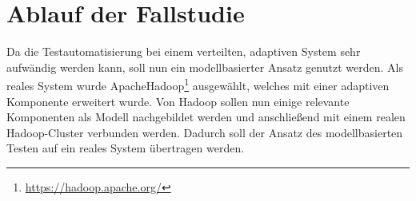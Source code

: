 \chapter{Ablauf der Fallstudie}\label{sec:fallstudie}

Da die Testautomatisierung bei einem verteilten, adaptiven System sehr aufwändig werden kann, soll nun ein modellbasierter Ansatz genutzt werden. Als reales System wurde Apache\texttrademark Hadoop\textregistered\footnote{\url{https://hadoop.apache.org/}} ausgewählt, welches mit einer adaptiven Komponente erweitert wurde. Von Hadoop sollen nun einige relevante Komponenten als Modell nachgebildet werden und anschließend mit einem realen Hadoop-Cluster verbunden werden. Dadurch soll der Ansatz des modellbasierten Testen auf ein reales System übertragen werden.







